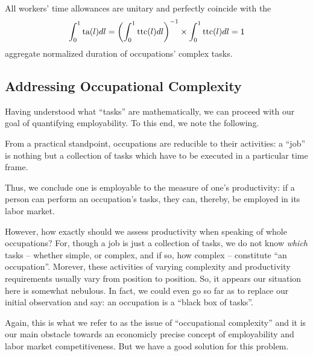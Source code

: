 \documentclass[hidelinks, nonatbib]{elsarticle}
\begin{document}
\begin{axiom}
    All workers' time allowances are unitary and perfectly coincide with the
    \begin{gather}
        \int_{0}^{1}
        \text{ta}(l)
        dl
        =
        \left(
            \int_{0}^{1}
            \text{ttc}(l)
            dl
        \right) ^ {-1}
        \times
        \int_{0}^{1}{
            \text{ttc}(l)
            dl
        }
        =
        1
    \end{gather}
    aggregate normalized duration of occupations' complex tasks.
\end{axiom}

\subsection{Addressing Occupational Complexity}
Having understood what ``tasks'' are mathematically, we can proceed with our goal of quantifying employability. To this end, we note the following.

\begin{observation}
    \label{oro}
    From a practical standpoint, occupations are reducible to their activities: a ``job'' is nothing but a collection of tasks which have to be executed in a particular time frame.
\end{observation}

Thus, we conclude one is employable to the measure of one's productivity: if a person can perform an occupation's tasks, they can, thereby, be employed in its labor market.

However, how exactly should we assess productivity when speaking of whole occupations? For, though a job is just a collection of tasks, we do not know \textit{which} tasks -- whether simple, or complex, and if so, how complex -- constitute ``an occupation''. Morever, these activities of varying complexity and productivity requirements usually vary from position to position. So, it appears our situation here is somewhat nebulous. In fact, we could even go so far as to replace our initial observation and say: an occupation is a ``black box of tasks''.

Again, this is what we refer to as the issue of ``occupational complexity'' and it is our main obstacle towards an economicly precise concept of employability and labor market competitiveness. But we have a good solution for this problem.
\end{document}
